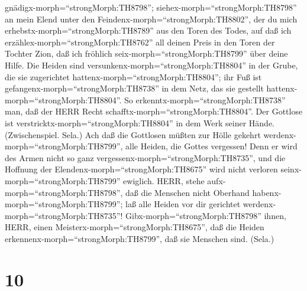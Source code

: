 gnädigx-morph=``strongMorph:TH8798'';
siehex-morph=``strongMorph:TH8798'' an mein Elend unter den
Feindenx-morph=``strongMorph:TH8802'', der du mich
erhebstx-morph=``strongMorph:TH8789'' aus den Toren des Todes,
 auf daß ich erzählex-morph=``strongMorph:TH8762'' all
deinen Preis in den Toren der Tochter Zion, daß ich fröhlich
seix-morph=``strongMorph:TH8799'' über deine Hilfe.  Die
Heiden sind versunkenx-morph=``strongMorph:TH8804'' in der Grube, die
sie zugerichtet hattenx-morph=``strongMorph:TH8804''; ihr Fuß ist
gefangenx-morph=``strongMorph:TH8738'' in dem Netz, das sie gestellt
hattenx-morph=``strongMorph:TH8804''.  So
erkenntx-morph=``strongMorph:TH8738'' man, daß der HERR Recht
schafftx-morph=``strongMorph:TH8804''. Der Gottlose ist
verstricktx-morph=``strongMorph:TH8804'' in dem Werk seiner Hände.
(Zwischenspiel. Sela.)  Ach daß die Gottlosen müßten zur
Hölle gekehrt werdenx-morph=``strongMorph:TH8799'', alle Heiden, die
Gottes vergessen!  Denn er wird des Armen nicht so ganz
vergessenx-morph=``strongMorph:TH8735'', und die Hoffnung der
Elendenx-morph=``strongMorph:TH8675'' wird nicht verloren
seinx-morph=``strongMorph:TH8799'' ewiglich.  HERR, stehe
aufx-morph=``strongMorph:TH8798'', daß die Menschen nicht Oberhand
habenx-morph=``strongMorph:TH8799''; laß alle Heiden vor dir gerichtet
werdenx-morph=``strongMorph:TH8735''! 
Gibx-morph=``strongMorph:TH8798'' ihnen, HERR, einen
Meisterx-morph=``strongMorph:TH8675'', daß die Heiden
erkennenx-morph=``strongMorph:TH8799'', daß sie Menschen sind. (Sela.)

\hypertarget{section-9}{%
\section{10}\label{section-9}}

